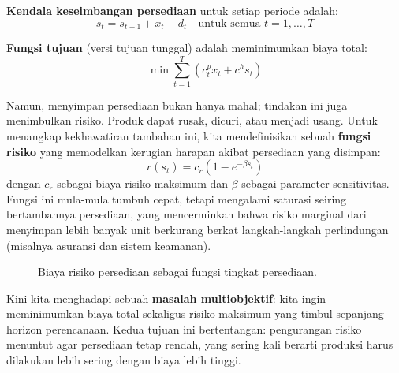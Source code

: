 \textbf{Kendala keseimbangan persediaan} untuk setiap periode adalah:
\[
s_t = s_{t-1} + x_t - d_t \quad \text{untuk semua } t = 1,\ldots,T
\]

\textbf{Fungsi tujuan} (versi tujuan tunggal) adalah meminimumkan biaya total:
\[
\min \sum_{t=1}^{T} \left( c^p_t x_t + c^h s_t \right)
\]

Namun, menyimpan persediaan bukan hanya mahal; tindakan ini juga menimbulkan risiko. Produk dapat rusak, dicuri, atau menjadi usang. Untuk menangkap kekhawatiran tambahan ini, kita mendefinisikan sebuah \textbf{fungsi risiko} yang memodelkan kerugian harapan akibat persediaan yang disimpan:
\[
r(s_t) = c_r \left(1 - e^{-\beta s_t}\right)
\]
dengan \(c_r\) sebagai biaya risiko maksimum dan \(\beta\) sebagai parameter sensitivitas. Fungsi ini mula-mula tumbuh cepat, tetapi mengalami saturasi seiring bertambahnya persediaan, yang mencerminkan bahwa risiko marginal dari menyimpan lebih banyak unit berkurang berkat langkah-langkah perlindungan (misalnya asuransi dan sistem keamanan).

\begin{figure}[h]
    \centering
    \caption{Biaya risiko persediaan sebagai fungsi tingkat persediaan.}
\end{figure}

Kini kita menghadapi sebuah \textbf{masalah multiobjektif}: kita ingin meminimumkan biaya total sekaligus risiko maksimum yang timbul sepanjang horizon perencanaan. Kedua tujuan ini bertentangan: pengurangan risiko menuntut agar persediaan tetap rendah, yang sering kali berarti produksi harus dilakukan lebih sering dengan biaya lebih tinggi.

